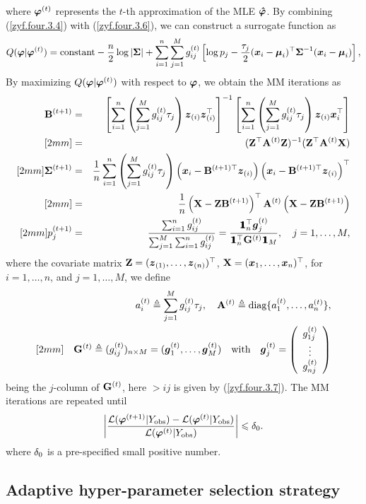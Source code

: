 where ${\mbox{\boldmath$\varphi$}}^{(t)}$ represents the $t$-th approximation of the MLE $\boldsymbol{\hat{\varphi}}$. By combining (\ref{zyf.four.3.4}) with (\ref{zyf.four.3.6}), we can construct a surrogate function as
$$
    Q({\mbox{\boldmath$\varphi$}} | {\mbox{\boldmath$\varphi$}}^{(t)}) = \mbox{constant} - \frac{n}{2} \log|{\mbox{\boldmath$\Sigma$}}| + \sum_{i=1}^n \sum_{j=1}^M g^{(t)}_{ij} \left[\log p_j - \frac{\tau_j}{2} ({\boldsymbol{x}}_i - {\boldsymbol{\mu}}_i)^\top {\mbox{\boldmath$\Sigma$}}^{-1} ({\boldsymbol{x}}_i - {\boldsymbol{\mu}}_i)\right],
$$
By maximizing $Q({\mbox{\boldmath$\varphi$}} | {\mbox{\boldmath$\varphi$}}^{(t)})$ with respect to ${\mbox{\boldmath$\varphi$}}$, we obtain the MM iterations as
\begin{eqnarray*}
    \bBtI &=& \left[\sum_{i=1}^n \left(\sum_{j=1}^M \gt{ij}\tau_j\right) \ibzi \ibzi^\top \right]^{-1} \left[\sum_{i=1}^n \left(\sum_{j=1}^M \gt{ij}\tau_j\right) \ibzi \ibx_i^\top \right] \\ [2mm]
    &=& (\bZ^\top \At{} \bZ)^{-1}(\bZ^\top \At{} \bX) \\ [2mm]
    \bSitI &=& \frac{1}{n} \sum_{i=1}^n \left(\sum_{j=1}^M \gt{ij}\tau_j\right) \left(\ibx_i - \bB^{(t+1)\top}\ibzi \right)\left(\ibx_i - \bB^{(t+1)\top}\ibzi \right)^\top \\ [2mm]
    &=& \frac{1}{n} \left(\bX - \bZ\bBtI\right)^\top \At{} \left(\bX - \bZ\bBtI \right) \\ [2mm]
    \ptI{j} &=& \frac{\sum_{i=1}^n \gt{ij}}{\sum_{j=1}^M \sum_{i=1}^n \gt{ij}} = \frac{\1_n^\top \ibgt{j}}{\1_n^\top \bG^{(t)} \1_M}, \quad j = 1, \dots, M,
\end{eqnarray*}
where the covariate matrix ${\bf Z} = ({\boldsymbol{z}}_{(1)}, \dots, {\boldsymbol{z}}_{(n)})^\top$, ${\bf X} = ({\boldsymbol{x}}_1, \dots, {\boldsymbol{x}}_n)^\top$, for $i = 1, \dots, n$, and $j = 1, \dots, M$, we define
\begin{eqnarray*}
    && a^{(t)}_{i} \triangleq \sum_{j=1}^M g^{(t)}_{ij}\tau_j, \quad {\bf A}_{}^{(t)} \triangleq \mbox{diag}\{a^{(t)}_{1}, \dots, a^{(t)}_{n}\}, \\ [2mm]
    && {\bf G}^{(t)} \triangleq (g^{(t)}_{ij})_{n\times M} = (\boldsymbol{g}_{1}^{(t)}, \dots, \boldsymbol{g}_{M}^{(t)}) \quad \mbox{with} \quad \boldsymbol{g}_{j}^{(t)} = \left(
    \begin{array}{c}
        g^{(t)}_{1j}  \\
        \vdots \\
        g^{(t)}_{nj}
    \end{array} \right)
\end{eqnarray*}
being the $j$-column of ${\bf G}^{(t)}$, here $\gt{ij}$ is given by (\ref{zyf.four.3.7}). The MM iterations are repeated until
$$
   \bigg|\frac{\mathcal{L}({\mbox{\boldmath$\varphi$}}^{(t+1)}|Y_{\rm obs}) - \mathcal{L}({\mbox{\boldmath$\varphi$}}^{(t)}|Y_{\rm obs})} {\mathcal{L}({\mbox{\boldmath$\varphi$}}^{(t)}|Y_{\rm obs})}\bigg| \leqslant \delta_0.
$$
where $\delta_0$ is a pre-specified small positive number.

\subsection{Adaptive hyper-parameter selection strategy}        %


